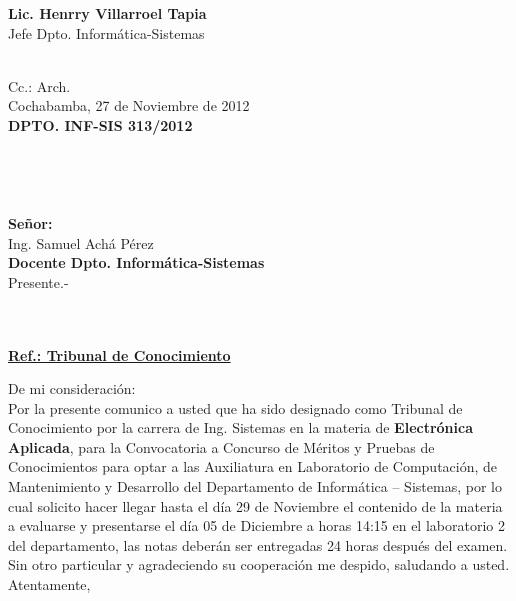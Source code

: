 \documentclass[letterpaper,11pt]{letter}
\begin{document}
\vspace{3.5cm}
\begin{center}
\begin{minipage}[b]{0.5\textwidth}
\begin{center}
{\bf Lic. Henrry Villarroel Tapia}\\
Jefe Dpto. Informática-Sistemas\\
\end{center}
\end{minipage}
\end{center}
~\\
Cc.: Arch.\\
\newpage
Cochabamba, 27 de Noviembre de 2012~\\
 \textbf{DPTO. INF-SIS 313/2012}\\
~\\
~\\
~\\
~\\
 \textbf{Señor:}~\\
Ing. Samuel Achá Pérez~\\
 \textbf{Docente Dpto. Informática-Sistemas}~\\
Presente.-\\
~\\
~\\
\begin{center}
\underline{ \textbf{Ref.: Tribunal de Conocimiento}}
\end{center}
De mi consideración:\\
Por la presente comunico a usted que ha sido designado como Tribunal de Conocimiento por la carrera de Ing. Sistemas en la materia de \textbf{Electrónica Aplicada}, para la Convocatoria a Concurso de Méritos y Pruebas de Conocimientos para optar a las Auxiliatura en Laboratorio de Computación, de Mantenimiento y Desarrollo del Departamento de Informática – Sistemas, por lo cual solicito hacer llegar hasta el día 29 de Noviembre el contenido de la materia a evaluarse y presentarse el día 05 de Diciembre a horas 14:15 en el laboratorio 2 del departamento, las notas deberán ser entregadas 24 horas después del examen.\\
Sin otro particular y agradeciendo su cooperación me despido, saludando a usted.\\
Atentamente,\\
\end{document}
